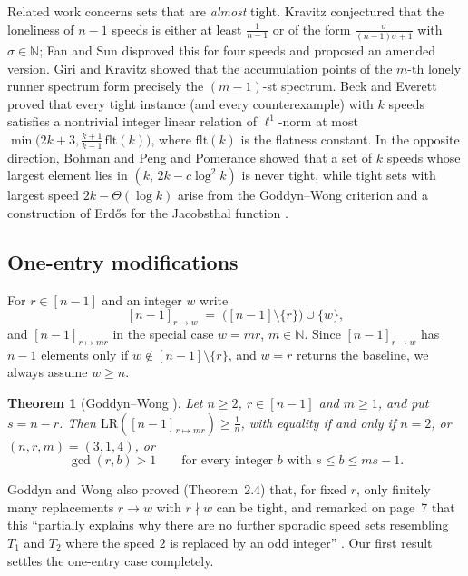 \documentclass[11pt]{article}
\newtheorem{theorem}{Theorem}[section]
\theoremstyle{definition}
\newcommand{\LR}{\mathrm{LR}}
\newcommand{\N}{\mathbb{N}}
\begin{document}
Related work concerns sets that are \emph{almost} tight. Kravitz
\cite{Kravitz2021} conjectured that the loneliness of $n-1$ speeds is
either at least $\frac1{n-1}$ or of the form
$\frac{\sigma}{(n-1)\sigma+1}$ with $\sigma\in\N$; Fan and Sun
\cite{FanSun2026} disproved this for four speeds and proposed an
amended version. Giri and Kravitz \cite{GiriKravitz2026} showed that the
accumulation points of the $m$-th lonely runner spectrum form precisely
the $(m-1)$-st spectrum. Beck and Everett \cite{BeckEverett2026} proved
that every tight instance (and every counterexample) with $k$ speeds
satisfies a nontrivial integer linear relation of $\ell^1$-norm at most
$\min\bigl(2k+3,\frac{k+1}{k-1}\,\mathrm{flt}(k)\bigr)$, where
$\mathrm{flt}(k)$ is the flatness constant. In the opposite direction,
Bohman and Peng \cite{BohmanPeng2022} and Pomerance \cite{Pomerance2022}
showed that a set of $k$ speeds whose largest element lies in
$(k,\,2k-c\log^2k)$ is never tight, while tight sets with largest speed
$2k-\Theta(\log k)$ arise from the Goddyn--Wong criterion and a
construction of Erdős for the Jacobsthal function
\cite[\S4]{PerarnauSerra2025}.

\subsection{One-entry modifications}

For $r\in[n-1]$ and an integer $w$ write
\[
[n-1]_{r\to w}\;=\;\bigl([n-1]\setminus\{r\}\bigr)\cup\{w\},
\]
and $[n-1]_{r\mapsto mr}$ in the special case $w=mr$, $m\in\N$. Since
$[n-1]_{r\to w}$ has $n-1$ elements only if $w\notin[n-1]\setminus\{r\}$,
and $w=r$ returns the baseline, we always assume $w\ge n$.

\begin{theorem}[Goddyn--Wong {\cite[Thm.~2.3]{GoddynWong2006}}]\label{thm:GW}
Let $n\ge2$, $r\in[n-1]$ and $m\ge1$, and put $s=n-r$. Then
$\LR([n-1]_{r\mapsto mr})\ge\frac1n$, with equality if and only if
$n=2$, or $(n,r,m)=(3,1,4)$, or
\begin{equation}\label{eq:gwcond}
\gcd(r,b)>1\qquad\text{for every integer } b \text{ with } s\le b\le ms-1 .
\end{equation}
\end{theorem}

Goddyn and Wong also proved (Theorem~2.4) that, for fixed $r$, only
finitely many replacements $r\to w$ with $r\nmid w$ can be tight, and
remarked on page~7 that this ``partially explains why there are no
further sporadic speed sets resembling $T_1$ and $T_2$ where the speed
$2$ is replaced by an odd integer'' \cite[p.~7]{GoddynWong2006}.
Our first result settles the one-entry case completely.
\end{document}
